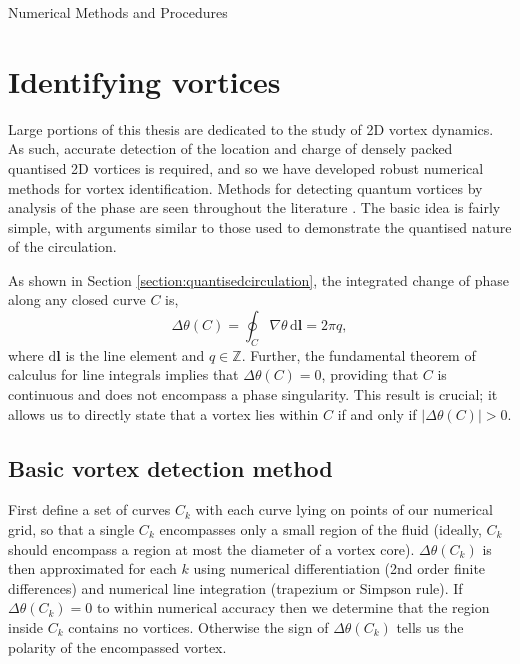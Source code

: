 \begin{chapter}{\label{cha:numerics}Numerical Methods and Procedures}
  

\section{\label{section:vortexidentifying} Identifying vortices}
Large portions of this thesis are dedicated to the study of 2D vortex dynamics. As such, accurate detection of the location and charge of densely packed quantised 2D vortices is required, and so we have developed robust numerical methods for vortex identification. Methods for detecting quantum vortices by analysis of the phase are seen throughout the literature \cite{Simula,saito10,white12,reeves_billam_13,reeves,white_anderson_14,PhysRevLett.113.165302,reeves_2015}. The basic idea is fairly simple, with arguments similar to those used to demonstrate the quantised nature of the circulation.

As shown in Section \ref{section:quantisedcirculation}, the integrated change of phase along any closed curve $C$ is,
\begin{equation}
  \Delta\theta(C) = \oint_C \! \nabla \theta  \, \mathrm{d}\mathbf{l} = 2\pi q,
\end{equation}
where $\mathrm{d}\mathbf{l}$ is the line element and $q\in\mathbb{Z}$. Further, the fundamental theorem of calculus for line integrals \cite{larson2013multivariable} implies that $\Delta\theta(C) = 0$, providing that $C$ is continuous and does not encompass a phase singularity. This result is crucial; it allows us to directly state that a vortex lies within $C$ if and only if $|\Delta\theta(C)| > 0 $.

\subsection{\label{section:vortexloc} Basic vortex detection method}
First define a set of curves $C_k$ with each curve lying on points of our numerical grid, so that a single $C_k$ encompasses only a small region of the fluid (ideally, $C_k$ should encompass a region at most the diameter of a vortex core). $\Delta\theta(C_k)$ is then approximated for each $k$ using numerical differentiation (2nd order finite differences) and numerical line integration (trapezium or Simpson rule). If $\Delta\theta(C_k) = 0$ to within numerical accuracy then we determine that the region inside $C_k$ contains no vortices. Otherwise the sign of $\Delta\theta(C_k)$ tells us the polarity of the encompassed vortex.


\end{chapter}

